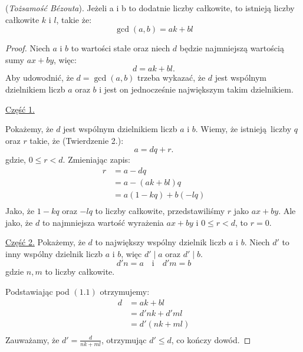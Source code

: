 \begin{theorem}
  (\textit{Tożsamość Bézouta}).
  Jeżeli a i b to dodatnie liczby całkowite,
  to istnieją liczby całkowite $k$ i $l$, takie że:
  \[
    \gcd(a, b) = ak + bl
  \]
\end{theorem}

\begin{proof}
  Niech $a$ i $b$ to wartości stałe
  oraz niech $d$ będzie najmniejszą wartością
  sumy $ax + by$, więc:
  \begin{equation}
    d = ak + bl.
  \end{equation}
  Aby udowodnić, że $d = \gcd(a, b)$ trzeba wykazać,
  że $d$ jest wspólnym dzielnikiem liczb $a$ oraz $b$
  i jest on jednocześnie największym takim dzielnikiem.

  \vspace{1em}

  \noindent\underline{Część 1.}

  Pokażemy, że $d$ jest wspólnym dzielnikiem liczb $a$ i $b$.
  Wiemy, że istnieją liczby $q$ oraz $r$ takie, że (Twierdzenie 2.):
  \[
    a = dq + r
  .\]
  gdzie, $0 \leq r < d$. Zmieniając zapis:
  \begin{align*}
    r &= a - dq \\ %
      &= a - (ak + bl)q \\
      &= a(1 - kq) + b(-lq) \\
  \end{align*}
  Jako, że $1 - kq$ oraz  $-lq$ to liczby całkowite, przedstawiliśmy
  $r$ jako $ax + by$. Ale jako, że $d$ to najmniejsza wartość wyrażenia
  $ax + by$ i $0 \leq r < d$, to $r = 0$.

  \vspace{1em}

  \noindent\underline{Część 2.}
  Pokażemy, że $d$ to największy wspólny dzielnik liczb $a$ i $b$.
  Niech $d'$ to inny wspólny dzielnik liczb $a$ i $b$, więc
  $d' \mid a$ oraz $d' \mid b$.
  \[
    d'n = a \quad \mathrm{i} \quad d'm = b
  \]
  gdzie $n, m$ to liczby całkowite.

  Podstawiając pod  $(1.1)$ otrzymujemy:
  \begin{align*}
    d &= ak + bl \\
      &= d'nk + d'ml \\
      &= d'(nk + ml) \\
  \end{align*}
  Zauważamy, że $d' = \frac{d}{nk + ml}$, otrzymując $d' \leq d$, co kończy dowód.
\end{proof}

